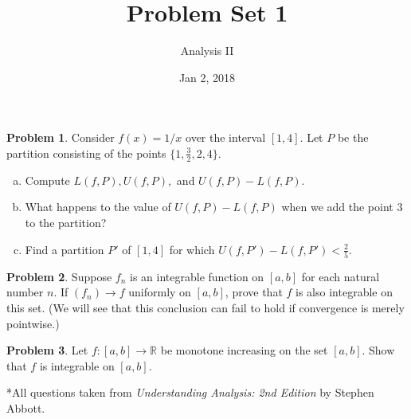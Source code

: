 \documentclass{amsart}
\newcommand{\+}[1]{\ensuremath{\mathbf{#1}}}
\newcommand{\R}{{\mathbb R}}
\theoremstyle{definition}
\newtheorem{prob}{Problem}
\begin{document}
\title{Problem Set 1}
\date{Jan 2, 2018}
\author{Analysis II}

\maketitle

\begin{prob}
 Consider $f(x) = 1/x$
 over the interval $[1,4]$.
 Let $P$ be the partition consisting of the points
 $\{1, \frac{3}{2}, 2, 4\}$.
 \begin{enumerate}[(a)]
  \item Compute $L(f,P), U(f,P),$ and $U(f,P) - L(f,P)$.
  \item What happens to the value of $U(f,P) - L(f,P)$
  when we add the point $3$ to the partition?
  \item Find a partition $P'$ of $[1,4]$ for which
  $U(f,P') - L(f,P') < \frac{2}{5}$.
 \end{enumerate}
\end{prob}

\vspace{3mm}

\begin{prob}
 Suppose $f_n$ is an integrable function on $[a,b]$ for 
 each natural number $n$.  If $(f_n) \to f$
 uniformly on $[a,b]$,
 prove that $f$ is also integrable on this set.
(We will see that this conclusion can fail to hold
if convergence is merely pointwise.)
\end{prob}


\vspace{3mm}


\begin{prob}
 Let $f: [a,b] \to \R$ be monotone increasing on the set $[a,b]$.
 Show that $f$ is integrable on $[a,b]$.
\end{prob}


\vspace{5mm}

*All questions taken from \emph{Understanding Analysis: 2nd Edition} by Stephen Abbott.
\end{document}
